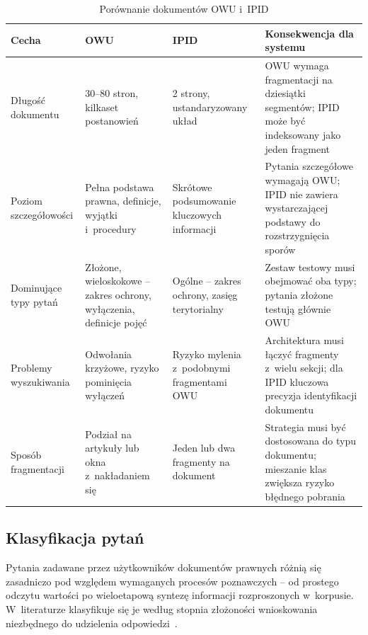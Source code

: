 \begin{table}[H]
  \caption{Porównanie dokumentów OWU i~IPID}\label{tab:porownanie-dokumentow-owu-ipid}
  \centering
  \small
  \renewcommand{\arraystretch}{1.3}
  \begin{tabularx}{\textwidth}{@{} p{3cm} p{3cm} p{3cm} X @{}}
    \toprule
    \textbf{Cecha}
     & \textbf{OWU}
     & \textbf{IPID}
     & \textbf{Konsekwencja dla systemu}                     \\
    \midrule
    Długość dokumentu
     & 30--80 stron, kilkaset postanowień
     & 2 strony, ustandaryzowany układ
     & OWU wymaga fragmentacji na dziesiątki segmentów;
    IPID może być indeksowany jako jeden fragment            \\
    \addlinespace
    Poziom szczegółowości
     & Pełna podstawa prawna, definicje, wyjątki i~procedury
     & Skrótowe podsumowanie kluczowych informacji
     & Pytania szczegółowe wymagają OWU; IPID nie zawiera
    wystarczającej podstawy do rozstrzygnięcia sporów        \\
    \addlinespace
    Dominujące typy pytań
     & Złożone, wieloskokowe -- zakres ochrony, wyłączenia,
    definicje pojęć
     & Ogólne -- zakres ochrony, zasięg terytorialny
     & Zestaw testowy musi obejmować oba typy;
    pytania złożone testują głównie OWU                      \\
    \addlinespace
    Problemy wyszukiwania
     & Odwołania krzyżowe, ryzyko pominięcia wyłączeń
     & Ryzyko mylenia z~podobnymi fragmentami OWU
     & Architektura musi łączyć fragmenty z~wielu sekcji;
    dla IPID kluczowa precyzja identyfikacji dokumentu       \\
    \addlinespace
    Sposób fragmentacji
     & Podział na artykuły lub okna z~nakładaniem się
     & Jeden lub dwa fragmenty na dokument
     & Strategia musi być dostosowana do typu dokumentu;
    mieszanie klas zwiększa ryzyko błędnego pobrania         \\
    \bottomrule
  \end{tabularx}
\end{table}

\clearpage{}

\subsection{Klasyfikacja pytań}\label{subsec:klasyfikacja-pytan}

Pytania zadawane przez użytkowników dokumentów prawnych różnią się zasadniczo
pod względem wymaganych procesów poznawczych -- od prostego odczytu wartości po
wieloetapową syntezę informacji rozproszonych w~korpusie. W~literaturze
klasyfikuje się je według stopnia złożoności wnioskowania niezbędnego do
udzielenia odpowiedzi~\cite{yang2018hotpotqa, koreeda2021contractnli}.

